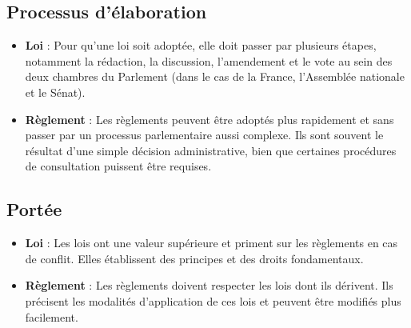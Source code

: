 \subsection{Processus d'élaboration}
\begin{itemize}
    \item \textbf{Loi} : Pour qu'une loi soit adoptée, elle doit passer par plusieurs étapes, notamment la rédaction, la discussion, l'amendement et le vote au sein des deux chambres du Parlement (dans le cas de la France, l'Assemblée nationale et le Sénat).
    \item \textbf{Règlement} : Les règlements peuvent être adoptés plus rapidement et sans passer par un processus parlementaire aussi complexe. Ils sont souvent le résultat d'une simple décision administrative, bien que certaines procédures de consultation puissent être requises.
\end{itemize}
\subsection{Portée}
\begin{itemize}
    \item \textbf{Loi} : Les lois ont une valeur supérieure et priment sur les règlements en cas de conflit. Elles établissent des principes et des droits fondamentaux.
    \item \textbf{Règlement} : Les règlements doivent respecter les lois dont ils dérivent. Ils précisent les modalités d'application de ces lois et peuvent être modifiés plus facilement.
\end{itemize}
